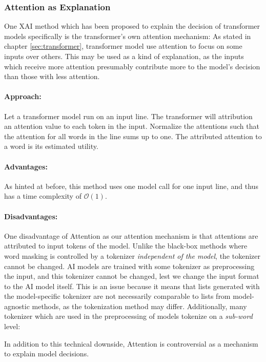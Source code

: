 \subsubsection{Attention as Explanation}
One XAI method which has been proposed to explain the decision of transformer models specifically is the transformer's own attention mechanism:
As stated in chapter \ref{sec:transformer}, transformer model use attention to focus on some inputs over others.
This may be used as a kind of explanation, as the inputs which receive more attention presumably contribute more to the model's decision than those with less attention.

\paragraph{Approach:}
Let a transformer model run on an input line.
The transformer will attribution an attention value to each token in the input.
Normalize the attentions such that the attention for all words in the line sums up to one.
The attributed attention to a word is its estimated utility.

\paragraph{Advantages:}
As hinted at before, this method uses one model call for one input line, and thus has a time complexity of $\mathcal{O}(1)$.


\paragraph{Disadvantages:}
One disadvantage of Attention as our attention mechanism is that attentions are attributed to input tokens of the model.
Unlike the black-box methods where word masking is controlled by a tokenizer \textit{independent of the model}, the tokenizer cannot be changed.
AI models are trained with some tokenizer as preprocessing the input, and this tokenizer cannot be changed, lest we change the input format to the AI model itself.
This is an issue because it means that lists generated with the model-specific tokenizer are not necessarily comparable to lists from model-agnostic methods, as the tokenization method may differ.
Additionally, many tokenizer which are used in the preprocessing of models tokenize on a \textit{sub-word} level:

In addition to this technical downside, Attention is controversial as a mechanism to explain model decisions.

